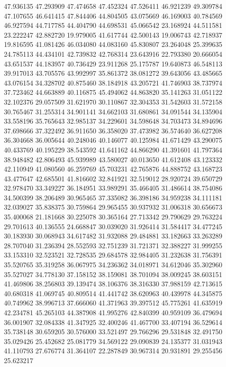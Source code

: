 47.936135
47.293909
47.474658
47.452324
47.526411
46.921239
49.309784
47.107655
46.641415
47.844406
44.804505
43.075669
46.169003
40.784569
46.927594
44.717785
44.404790
44.698531
45.066542
23.168924
44.511581
23.222247
42.882720
19.979005
41.617744
42.500143
19.006743
42.718937
19.816595
41.081426
46.034080
44.083160
45.830807
23.264048
25.399635
24.785113
44.434101
42.739832
42.768314
23.643916
22.793380
20.666054
43.651537
44.183957
40.736429
23.911268
25.175787
19.640873
46.548113
39.917013
43.705576
43.992997
35.861372
38.081272
39.643056
43.485665
43.076154
34.328702
40.875460
38.184918
43.205721
41.746903
38.737974
37.723462
44.663889
40.116875
45.494062
44.863820
35.141263
31.051122
32.102376
29.057509
31.621970
30.110867
32.304353
31.542603
31.572158
30.765467
31.255314
34.901141
34.662103
31.680861
34.091544
34.135904
33.558196
35.765643
32.985137
34.229601
34.598648
34.703473
34.894696
37.698666
37.322492
36.911650
36.358020
37.473982
36.574640
36.627208
36.304668
36.005644
40.248046
40.146077
40.125984
41.671429
43.290075
40.433769
40.195229
38.543592
41.641162
44.866290
41.391601
41.797364
38.948482
42.806493
45.939989
43.580027
40.013650
41.612408
43.123332
42.110949
41.080560
46.259769
45.703231
42.765876
44.888752
43.168723
43.477647
42.685501
41.816602
32.841921
32.519012
28.920724
39.650729
32.978470
33.349227
36.184951
33.989291
35.466405
31.486614
38.754086
34.500399
38.206489
30.965465
37.335082
36.398186
34.959238
34.111181
32.039027
35.838375
30.759864
29.965455
30.937932
31.006318
30.656673
35.400068
21.181668
30.225078
30.365164
27.713342
29.790629
29.763224
29.701613
40.136555
24.668847
30.039020
31.926414
31.584417
34.477245
30.183930
30.068943
34.617482
31.932088
29.484881
33.182663
33.263289
28.707040
31.236394
28.552593
32.751239
31.721371
32.388227
31.999255
33.153310
32.523521
32.728535
29.684578
32.984405
31.232638
31.756391
35.520765
35.319258
36.067975
34.236362
34.018971
34.612046
35.302960
35.527027
34.778130
37.158152
38.159081
38.701094
38.009245
38.603151
41.469806
38.256803
39.139474
38.106376
38.316330
37.988159
42.713615
40.680318
41.069745
40.809514
41.441742
38.620963
40.439978
44.345875
40.749962
38.996713
37.666060
41.371963
39.397512
45.775261
41.635919
42.234781
45.265103
44.387908
41.995276
42.840399
40.959109
36.479694
36.001907
32.084338
41.347925
32.400246
41.467700
33.407194
36.529614
35.738148
30.659205
30.576000
33.521497
29.766296
29.531848
32.491750
35.029426
25.452682
25.081779
34.569122
29.090839
24.135377
31.031943
41.110793
27.676774
31.364107
22.287849
30.967314
20.931891
29.255456
25.623217
